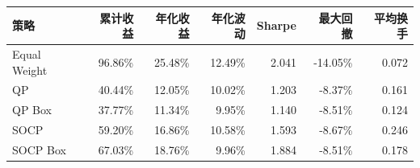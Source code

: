 \begin{center}
\small
\begin{tabular}{lrrrrrr}
\toprule
策略 & 累计收益 & 年化收益 & 年化波动 & Sharpe & 最大回撤 & 平均换手 \\
\midrule
Equal Weight & 96.86\% & 25.48\% & 12.49\% & 2.041 & -14.05\% & 0.072 \\
QP & 40.44\% & 12.05\% & 10.02\% & 1.203 & -8.37\% & 0.161 \\
QP Box & 37.77\% & 11.34\% & 9.95\% & 1.140 & -8.51\% & 0.124 \\
SOCP & 59.20\% & 16.86\% & 10.58\% & 1.593 & -8.67\% & 0.246 \\
SOCP Box & 67.03\% & 18.76\% & 9.96\% & 1.884 & -8.51\% & 0.178 \\
\bottomrule
\end{tabular}
\end{center}